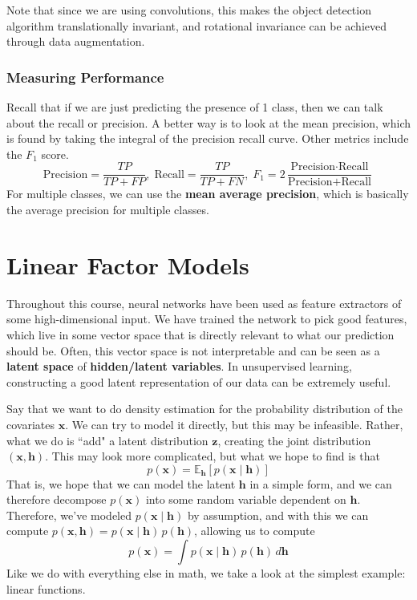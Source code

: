 \documentclass{article}
\theoremstyle{definition}
\theoremstyle{remark}
\theoremstyle{definition}
\begin{document}
Note that since we are using convolutions, this makes the object detection algorithm translationally invariant, and rotational invariance can be achieved through data augmentation. 

\subsubsection{Measuring Performance} 

Recall that if we are just predicting the presence of 1 class, then we can talk about the recall or precision. A better way is to look at the mean precision, which is found by taking the integral of the precision recall curve. Other metrics include the $F_1$ score. 
\[\text{Precision} = \frac{TP}{TP + FP}, \; \text{Recall} = \frac{TP}{TP + FN}, \; F_1 = 2 \frac{\text{Precision} \cdot \text{Recall}}{\text{Precision} + \text{Recall}}\]
For multiple classes, we can use the \textbf{mean average precision}, which is basically the average precision for multiple classes.

\section{Linear Factor Models}

Throughout this course, neural networks have been used as feature extractors of some high-dimensional input. We have trained the network to pick good features, which live in some vector space that is directly relevant to what our prediction should be. Often, this vector space is not interpretable and can be seen as a \textbf{latent space} of \textbf{hidden/latent variables}. In unsupervised learning, constructing a good latent representation of our data can be extremely useful. 

Say that we want to do density estimation for the probability distribution of the covariates $\mathbf{x}$. We can try to model it directly, but this may be infeasible. Rather, what we do is ``add" a latent distribution $\mathbf{z}$, creating the joint distribution $(\mathbf{x}, \mathbf{h})$. This may look more complicated, but what we hope to find is that 
\[p(\mathbf{x}) = \mathbb{E}_{\mathbf{h}} [ p(\mathbf{x} \mid \mathbf{h})]\]
That is, we hope that we can model the latent $\mathbf{h}$ in a simple form, and we can therefore decompose $p(\mathbf{x})$ into some random variable dependent on $\mathbf{h}$. Therefore, we've modeled $p(\mathbf{x} \mid \mathbf{h})$ by assumption, and with this we can compute $p(\mathbf{x}, \mathbf{h}) = p( \mathbf{x} \mid \mathbf{h}) \, p( \mathbf{h})$, allowing us to compute 
\[p( \mathbf{x}) = \int p(\mathbf{x} \mid \mathbf{h}) \, p(\mathbf{h}) \, d\mathbf{h}\]
Like we do with everything else in math, we take a look at the simplest example: linear functions. 
\end{document}

